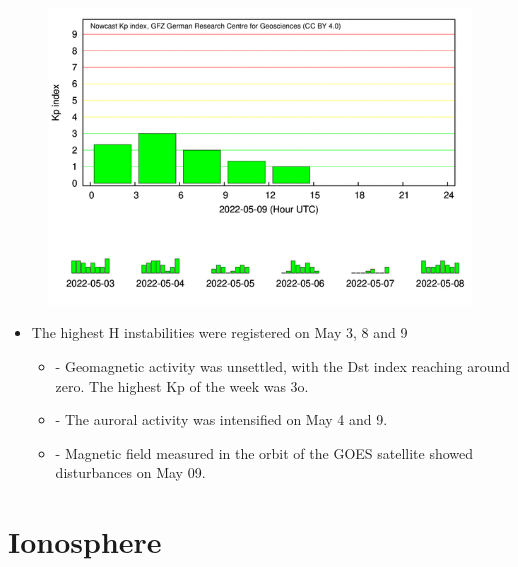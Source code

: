 \documentclass[a4paper, 10pt]{article}
\begin{document}
                     \begin{figure}[H]
    
                        \centering
   
                             \includegraphics[width=14cm]{./figures//figureGeomag_6.png}

                        \end{figure}

                     \begin{itemize} 
\begin{itemize} 
 \item - Data from the Embrace magnetometer network showed instabilities throughout the period, with some events highlighted:
 \end{itemize} 
\item The highest H instabilities were registered on May 3, 8 and 9
\begin{itemize} 
 \item - Geomagnetic activity was unsettled, with the Dst index reaching around zero. The highest Kp of the week was 3o.
 \end{itemize} 
\begin{itemize} 
 \item - The auroral activity was intensified on May 4 and 9.
 \end{itemize} 
\begin{itemize} 
 \item - Magnetic field measured in the orbit of the GOES satellite showed disturbances on May 09.
 \end{itemize} 
\end{itemize} 
\section{Ionosphere} 
\end{document}
